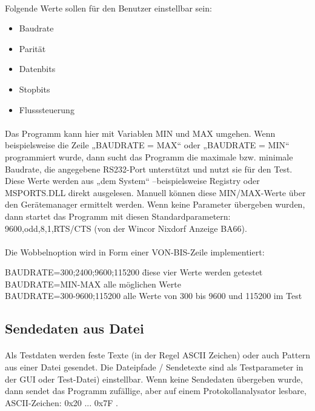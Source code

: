 \paragraph{}
Folgende Werte sollen für den Benutzer einstellbar sein:

\begin{itemize}
\item Baudrate
\item Parität
\item Datenbits
\item Stopbits
\item Flusssteuerung
\end{itemize}
\paragraph{}
Das Programm kann hier mit Variablen MIN und MAX umgehen. Wenn beispielsweise die Zeile „BAUDRATE = MAX“ oder „BAUDRATE = MIN“  programmiert wurde, dann sucht das Programm die maximale bzw. minimale Baudrate, die angegebene RS232-Port unterstützt und nutzt sie für den Test. Diese Werte werden aus „dem System“ –beispielsweise Registry oder  MSPORTS.DLL direkt ausgelesen. Manuell können diese MIN/MAX-Werte über den Gerätemanager ermittelt werden. Wenn keine Parameter übergeben wurden, dann startet das Programm mit diesen Standardparametern: 9600,odd,8,1,RTS/CTS (von der Wincor Nixdorf Anzeige BA66).

\paragraph{}
Die Wobbelnoption wird in Form einer VON-BIS-Zeile implementiert:

\begin{tabbing}
\hspace*{10mm} BAUDRATE=300;2400;9600;115200 \= diese vier Werte werden getestet
\\
\hspace*{10mm} BAUDRATE=MIN-MAX \>alle möglichen Werte
\\
\hspace*{10mm} BAUDRATE=300-9600;115200 \>alle Werte von 300 bis 9600 und 115200 im Test
\end{tabbing}


\subsection{Sendedaten aus Datei}
\paragraph{}
Als Testdaten werden feste Texte (in der Regel ASCII Zeichen) oder auch Pattern aus einer Datei gesendet. Die Dateipfade / Sendetexte sind als Testparameter in der GUI oder Test-Datei) einstellbar. Wenn keine Sendedaten übergeben wurde, dann sendet das Programm zufällige, aber auf einem Protokollanalysator lesbare, ASCII-Zeichen: 0x20 ... 0x7F .


